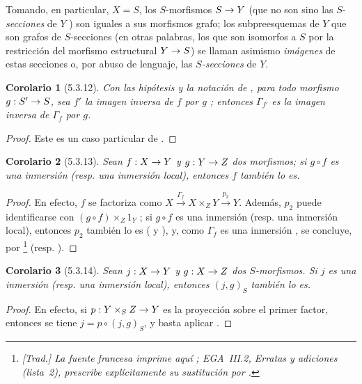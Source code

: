 \documentclass[oneside]{amsart}
\theoremstyle{ega-env-style}
\theoremstyle{ega-thm-env-style}
\newtheorem*{corollary}{Corolario}
\theoremstyle{ega-defn-env-style}
\renewcommand{\to}{\mathchoice{\longrightarrow}{\rightarrow}{\rightarrow}{\rightarrow}}
\let\EGAOriginalLabel\label
\renewcommand{\label}[1]{\phantomsection\EGAOriginalLabel{#1}}
\begin{document}
Tomando, en particular, $X=S$, los $S$-morfismos $S\to Y$ (que no son sino las $S$-\emph{secciones} de $Y$ ) son iguales a sus morfismos grafo;
los subpreesquemas de $Y$ que son grafos de $S$-secciones (en otras palabras, los que son isomorfos a $S$ por la restricción del morfismo estructural $Y\to S$) se llaman asimismo \emph{imágenes} de estas secciones o, por abuso de lenguaje, las \emph{$S$-secciones} de $Y$.

\begin{corollary}[5.3.12]
\label{I.5.3.12}
Con las hipótesis y la notación de , para todo morfismo $g:S'\to S$, sea $f'$ la imagen inversa de $f$ por $g$ ;
entonces $\Gamma_{f'}$ es la imagen inversa de $\Gamma_f$ por $g$.
\end{corollary}

\begin{proof}
Este es un caso particular de .
\end{proof}

\begin{corollary}[5.3.13]
\label{I.5.3.13}
Sean $f:X\to Y$ y $g:Y\to Z$ dos morfismos;
si $g\circ f$ es una inmersión (\textup{resp.} una inmersión local), entonces $f$ también lo es.
\end{corollary}

\begin{proof}
En efecto, $f$ se factoriza como $X\xrightarrow{\Gamma_f}X\times_Z Y\xrightarrow{p_2}Y$.
Además, $p_2$ puede identificarse con $(g\circ f)\times_Z 1_Y$ ;
si $g\circ f$ es una inmersión (resp. una inmersión local), entonces $p_2$ también lo es ( y ), y, como $\Gamma_f$ es una inmersión , se concluye, por \footnote{\emph{[Trad.] La fuente francesa imprime aquí ; EGA~III.2, Erratas y adiciones (lista~2), prescribe explícitamente su sustitución por .}} (resp. ).
\end{proof}

\begin{corollary}[5.3.14]
\label{I.5.3.14}
Sean $j:X\to Y$ y $g:X\to Z$ dos $S$-morfismos.
Si $j$ es una inmersión (\textup{resp.} una inmersión local), entonces $(j,g)_S$ también lo es.
\end{corollary}

\begin{proof}
En efecto, si $p:Y\times_S Z\to Y$ es la proyección sobre el primer factor, entonces se tiene $j=p\circ(j,g)_S$, y basta aplicar .
\end{proof}
\end{document}
